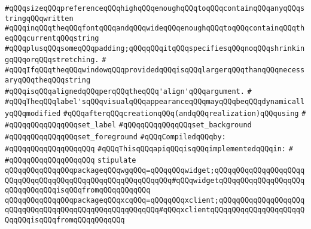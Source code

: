 \verb|#qQQqsizeqQQqpreferenceqQQqhighqQQqenoughqQQqtoqQQqcontainqQQqanyqQQqstringqQQqwritten|\newline
\verb|#qQQqinqQQqtheqQQqfontqQQqandqQQqwideqQQqenoughqQQqtoqQQqcontainqQQqtheqQQqcurrentqQQqstring|\newline
\verb|#qQQqplusqQQqsomeqQQqpadding;qQQqqQQqitqQQqspecifiesqQQqnoqQQqshrinkingqQQqorqQQqstretching.|\newline
\verb|#|\newline
\verb|#qQQqIfqQQqtheqQQqwindowqQQqprovidedqQQqisqQQqlargerqQQqthanqQQqnecessaryqQQqtheqQQqstring|\newline
\verb|#qQQqisqQQqalignedqQQqperqQQqtheqQQq'align'qQQqargument.|\newline
\verb|#|\newline
\verb|#qQQqTheqQQqlabel'sqQQqvisualqQQqappearanceqQQqmayqQQqbeqQQqdynamicallyqQQqmodified|\newline
\verb|#qQQqafterqQQqcreationqQQq(andqQQqrealization)qQQqusing|\newline
\verb|#|\newline
\verb|#qQQqqQQqqQQqqQQqset_label|\newline
\verb|#qQQqqQQqqQQqqQQqset_background|\newline
\verb|#qQQqqQQqqQQqqQQqset_foreground|\newline
\newline
\verb|#qQQqCompiledqQQqby:|\newline
\verb|#qQQqqQQqqQQqqQQqqQQq|\newline
\newline
\verb|#qQQqThisqQQqapiqQQqisqQQqimplementedqQQqin:|\newline
\verb|#|\newline
\verb|#qQQqqQQqqQQqqQQqqQQq|\newline
\newline
\verb|stipulate|\newline
\verb|qQQqqQQqqQQqqQQqpackageqQQqwgqQQq=qQQqqQQqwidget;qQQqqQQqqQQqqQQqqQQqqQQqqQQqqQQqqQQqqQQqqQQqqQQqqQQqqQQqqQQq#qQQqwidgetqQQqqQQqqQQqqQQqqQQqqQQqqQQqqQQqisqQQqfromqQQqqQQqqQQq|\newline
\verb|qQQqqQQqqQQqqQQqpackageqQQqxcqQQq=qQQqqQQqxclient;qQQqqQQqqQQqqQQqqQQqqQQqqQQqqQQqqQQqqQQqqQQqqQQqqQQqqQQq#qQQqxclientqQQqqQQqqQQqqQQqqQQqqQQqqQQqisqQQqfromqQQqqQQqqQQq|\newline
